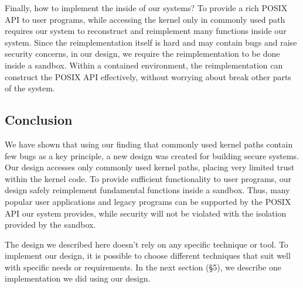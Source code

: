 Finally, how to implement the inside of our systems? 
To provide a rich POSIX API to user programs, while accessing the kernel only in commonly used path requires our system to 
reconstruct and reimplement many functions inside our system. Since the reimplementation itself is hard and may contain bugs 
and raise security concerns, in our design, we require the reimplementation to be done inside a sandbox. Within a contained 
environment, the reimplementation can construct the POSIX API effectively, without worrying about break other parts of the system.  

\subsection{Conclusion}
We have shown that using our finding that commonly used kernel paths contain few bugs as a key principle, a new design was created 
for building secure systems. Our design accesses only commonly used kernel paths, placing very limited trust within the kernel code. 
To provide sufficient functionality to user programs, our design safely reimplement fundamental functions inside a sandbox. Thus, many 
popular user applications and legacy programs can be supported by the POSIX API our system provides, while security will not be violated 
with the isolation provided by the sandbox. 

The design we described here doesn't rely on any specific technique or tool. To implement our design, it is possible to choose different techniques 
that suit well with specific needs or requirements. In the next section (\S{5}), we describe one implementation we did using our design. 
